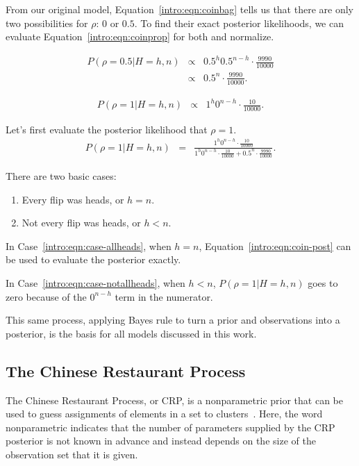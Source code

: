 From our original model, Equation~\ref{intro:eqn:coinbag} tells us that there are only two possibilities for $\rho$: $0$ or $0.5$. To find their exact posterior likelihoods, we can evaluate Equation~\ref{intro:eqn:coinprop} for both and normalize.

\begin{eqnarray}
P(\rho=0.5|H=h,n) & \propto & {0.5}^h {0.5}^{n-h} \cdot \frac{9990}{10000}\\
& \propto & {0.5}^n \cdot \frac{9990}{10000}.
\end{eqnarray}

\begin{eqnarray}
P(\rho=1|H=h,n) & \propto &  1^h 0^{n-h} \cdot \frac{10}{10000}.
\end{eqnarray}

Let's first evaluate the posterior likelihood that $\rho=1$.
\begin{eqnarray}
\label{intro:eqn:coin-post}P(\rho=1|H=h,n) & = & \frac{1^h 0^{n-h} \cdot \frac{10}{10000}}{1^h 0^{n-h} \cdot \frac{10}{10000}+{0.5}^n \cdot \frac{9990}{10000}}.
\end{eqnarray}

There are two basic cases:
\begin{enumerate}
\item \label{intro:eqn:case-allheads} Every flip was heads, or $h=n$.
\item \label{intro:eqn:case-notallheads} Not every flip was heads, or $h<n$.
\end{enumerate}

In Case~\ref{intro:eqn:case-allheads}, when $h=n$, Equation~\ref{intro:eqn:coin-post} can be used to evaluate the posterior exactly.

In Case~\ref{intro:eqn:case-notallheads}, when $h<n$, $P(\rho=1|H=h,n)$ goes to zero because of the $0^{n-h}$ term in the numerator.

This same process, applying Bayes rule to turn a prior and observations into a posterior, is the basis for all models discussed in this work.

\subsection{The Chinese Restaurant Process}

The Chinese Restaurant Process, or CRP, is a nonparametric prior that can be used to guess assignments of elements in a set to clusters~\cite{teh2010dirichlet}. Here, the word nonparametric indicates that the number of parameters supplied by the CRP posterior is not known in advance and instead depends on the size of the observation set that it is given.


